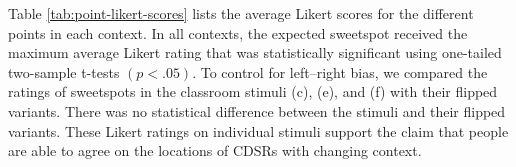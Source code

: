 \documentclass[11pt,letterpaper]{article}
\begin{document}


Table \ref{tab:point-likert-scores} lists the average Likert scores for the different points in each context. In all contexts, the expected sweetspot received the maximum average Likert rating that was statistically significant using one-tailed two-sample t-tests $(p<.05)$.  To control for left--right bias, we compared the ratings of sweetspots in the classroom stimuli (c), (e), and (f) with their flipped variants.  There was no statistical difference between the stimuli and their flipped variants.  These Likert ratings on individual stimuli support the claim that people are able to agree on the locations of CDSRs with changing context.  


\end{document}
